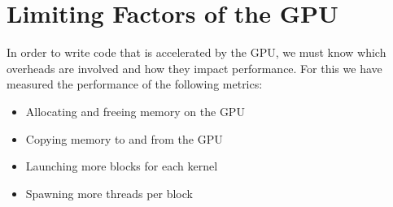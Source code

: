 \section{Limiting Factors of the GPU}

In order to write code that is accelerated by the GPU, we must know which overheads are involved and how they impact performance. 
For this we have measured the performance of the following metrics: 

\begin{itemize}
    \item Allocating and freeing memory on the GPU
    \item Copying memory to and from the GPU
    \item Launching more blocks for each kernel
    \item Spawning more threads per block
\end{itemize}

